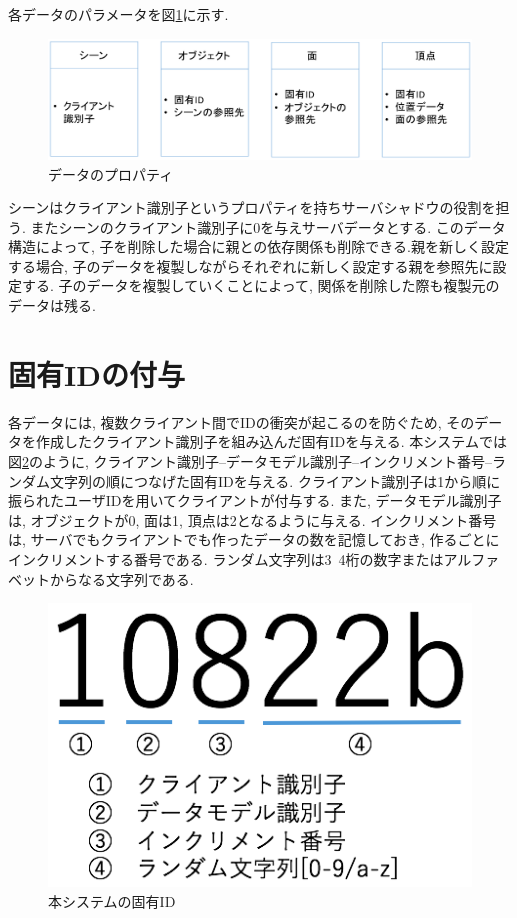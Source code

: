 各データのパラメータを図\ref{プロパティ}に示す.
\begin{figure}[htbp]
  \begin{center}
    \includegraphics[scale=0.3]{images/prop}
    \caption{データのプロパティ}
    \label{プロパティ}
  \end{center}
\end{figure}
シーンはクライアント識別子というプロパティを持ちサーバシャドウの役割を担う.
またシーンのクライアント識別子に0を与えサーバデータとする.
このデータ構造によって, 子を削除した場合に親との依存関係も削除できる.親を新しく設定する場合, 子のデータを複製しながらそれぞれに新しく設定する親を参照先に設定する.
子のデータを複製していくことによって, 関係を削除した際も複製元のデータは残る.
\section{固有IDの付与} \label{固有id}
各データには, 複数クライアント間でIDの衝突が起こるのを防ぐため, そのデータを作成したクライアント識別子を組み込んだ固有IDを与える.
本システムでは図\ref{uuid}のように, クライアント識別子--データモデル識別子--インクリメント番号--ランダム文字列の順につなげた固有IDを与える. クライアント識別子は1から順に振られたユーザIDを用いてクライアントが付与する. また, データモデル識別子は, オブジェクトが0, 面は1, 頂点は2となるように与える.
インクリメント番号は, サーバでもクライアントでも作ったデータの数を記憶しておき, 作るごとにインクリメントする番号である. ランダム文字列は3~4桁の数字またはアルファベットからなる文字列である.
\begin{figure}[htbp]
  \begin{center}
    \includegraphics[scale=0.5]{images/uuid}
    \caption{本システムの固有ID}
    \label{uuid}
  \end{center}
\end{figure}
